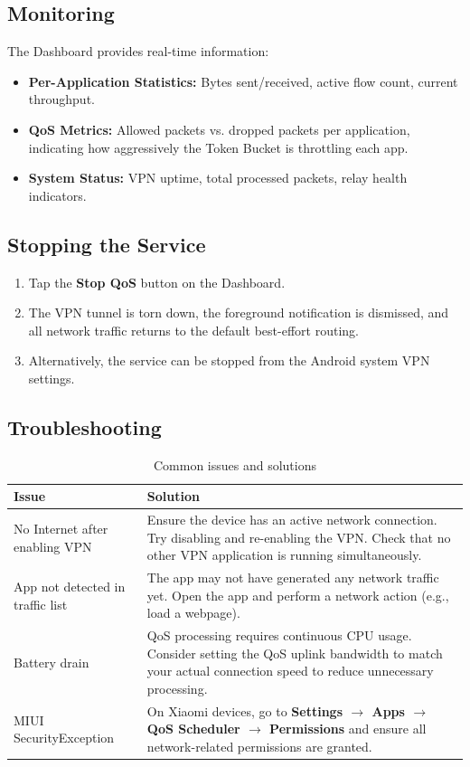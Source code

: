\subsection{Monitoring}

The Dashboard provides real-time information:

\begin{itemize}
    \item \textbf{Per-Application Statistics:} Bytes sent/received, active flow count, current throughput.
    \item \textbf{QoS Metrics:} Allowed packets vs. dropped packets per application, indicating how aggressively the Token Bucket is throttling each app.
    \item \textbf{System Status:} VPN uptime, total processed packets, relay health indicators.
\end{itemize}

\subsection{Stopping the Service}

\begin{enumerate}
    \item Tap the \textbf{Stop QoS} button on the Dashboard.
    \item The VPN tunnel is torn down, the foreground notification is dismissed, and all network traffic returns to the default best-effort routing.
    \item Alternatively, the service can be stopped from the Android system VPN settings.
\end{enumerate}

\subsection{Troubleshooting}

\begin{table}[H]
\centering
\caption{Common issues and solutions}
\label{tab:troubleshooting}
\begin{tabular}{@{}p{4.5cm}p{8.5cm}@{}}
\toprule
\textbf{Issue} & \textbf{Solution} \\
\midrule
No Internet after enabling VPN & Ensure the device has an active network connection. Try disabling and re-enabling the VPN. Check that no other VPN application is running simultaneously. \\
\addlinespace
App not detected in traffic list & The app may not have generated any network traffic yet. Open the app and perform a network action (e.g., load a webpage). \\
\addlinespace
Battery drain & QoS processing requires continuous CPU usage. Consider setting the QoS uplink bandwidth to match your actual connection speed to reduce unnecessary processing. \\
\addlinespace
MIUI SecurityException & On Xiaomi devices, go to \textbf{Settings $\rightarrow$ Apps $\rightarrow$ QoS Scheduler $\rightarrow$ Permissions} and ensure all network-related permissions are granted. \\
\bottomrule
\end{tabular}
\end{table}
